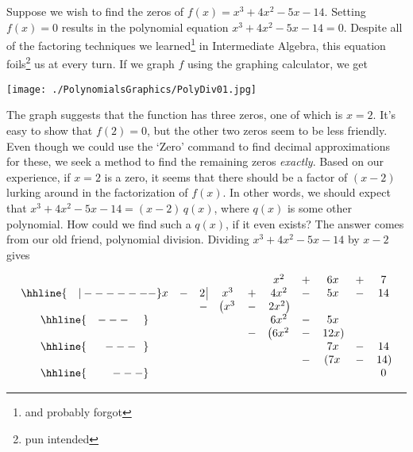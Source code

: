 

\setcounter{footnote}{0}

\label{Polydivision}


Suppose we wish to find the zeros of $f(x) = x^3 + 4x^2-5x-14$.  Setting $f(x)=0$ results in the polynomial equation $x^3 + 4x^2-5x-14=0$.   Despite all of the factoring techniques we learned\footnote{and probably forgot} in Intermediate Algebra, this equation foils\footnote{pun intended} us at every turn.  If we graph $f$ using the graphing calculator, we get

\smallskip

\centerline{\texttt{[image: ./PolynomialsGraphics/PolyDiv01.jpg]}}

\smallskip

The graph suggests that the function has three zeros, one of which is $x=2$.  It's easy to show that $f(2) = 0$, but the other two zeros seem to be less friendly.  Even though we could use the `Zero' command to find decimal approximations for these, we seek a method to find the remaining zeros \emph{exactly}.  Based on our experience, if $x=2$ is a zero, it seems that there should be a factor of $(x-2)$ lurking around in the factorization of $f(x)$.  In other words, we should expect that $x^3 + 4x^2-5x-14=(x-2) \, q(x)$, where $q(x)$ is some other polynomial.  How could we find such a $q(x)$, if it even exists?  The answer comes from our old friend, polynomial division. Dividing $x^3 + 4x^2-5x-14$ by $x-2$ gives

\setlength\arraycolsep{0.1pt}
\setlength\extrarowheight{2pt}

\[ \begin{array}{cccccccccc}

& & & & & x^2 & + & 6x & + & 7 \\ \hhline{~~~|-------}

x & - & 2 \, \vline& x^3 & + & 4x^2 & - & 5x & - & 14 \\

 &  &  -& \left(x^3 \right. & - & \left.  2x^2\right) &  &  &  &  \\ \hhline{~~~---~~~~} 
 &  &  &   &  & 6 x^2 & - & 5x &  &  \\ 
 &  &  &   & - & \left(6 x^2 \right. & - & \left. 12x \right) &  &  \\ \hhline{~~~~~---~~} 
 &  &  &   &   &  & & 7x  & - & 14 \\
 &  &  &   &   &  & - & \left( 7x \right. & - & \left. 14 \right) \\ \hhline{~~~~~~~---} 
 &   &  &  &  &  &  &  &  & 0
 
\end{array}\]

